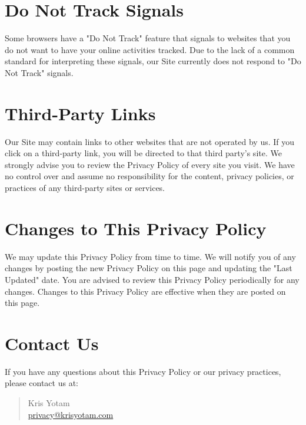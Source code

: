 \documentclass[11pt]{article}
\begin{document}
\section{Do Not Track Signals}

Some browsers have a "Do Not Track" feature that signals to websites that you do not want to have your online activities tracked. Due to the lack of a common standard for interpreting these signals, our Site currently does not respond to "Do Not Track" signals.

\section{Third-Party Links}

Our Site may contain links to other websites that are not operated by us. If you click on a third-party link, you will be directed to that third party's site. We strongly advise you to review the Privacy Policy of every site you visit. We have no control over and assume no responsibility for the content, privacy policies, or practices of any third-party sites or services.

\section{Changes to This Privacy Policy}

We may update this Privacy Policy from time to time. We will notify you of any changes by posting the new Privacy Policy on this page and updating the "Last Updated" date. You are advised to review this Privacy Policy periodically for any changes. Changes to this Privacy Policy are effective when they are posted on this page.

\section{Contact Us}

If you have any questions about this Privacy Policy or our privacy practices, please contact us at:
\begin{quote}
  Kris Yotam\\
  \href{mailto:privacy@krisyotam.com}{privacy@krisyotam.com}
\end{quote}
\end{document}
